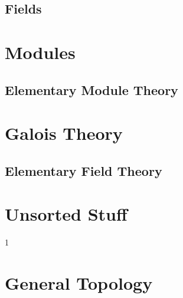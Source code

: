 \documentclass{book}                                                           %
\def\compiletopology{0}
\begin{document}
                \chapter{Fields}
                    \renewcommand{\PATH}{\PARPATH/Fields}
                    
            \part{Modules}
                \renewcommand{\PARPATH}{\TOPPATH/Modules}
                \chapter{Elementary  Module Theory}
                    \renewcommand{\PATH}{\PARPATH/Elementary_Properties}
                    \label{chapt:Elementary_Module_Theory}%
                    
            \part{Galois Theory}
                \renewcommand{\PARPATH}{\TOPPATH/Galois_Theory}
                \chapter{Elementary Field Theory}
                    \renewcommand{\PATH}{\PARPATH/Elementary_Field_Theory}
                    
                     
            \part{Unsorted Stuff}
                
                
                
                
        \clearpage
        \setcounter{endpage}{\thepage}
    \fi

    \if\compiletopology1
            \renewcommand{\TOPPATH}{books/Topology}
            \label{book:Topology}%
            \renewcommand{\PATH}{\TOPPATH/Topology}
            \setcounter{page}{\value{endpage}}
            \part{General Topology}
                \renewcommand{\PARPATH}{\TOPPATH/General_Topology}
\end{document}

